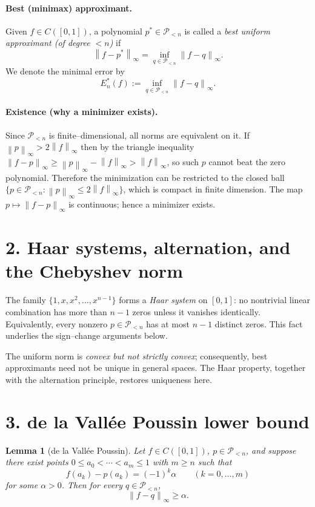 \documentclass[11pt,a4paper]{article}
\theoremstyle{definition}
\theoremstyle{definition}
\theoremstyle{plain}
\newtheorem{lemma}[exercise]{Lemma}
\theoremstyle{remark}
\newcommand{\norm}[1]{\left\lVert #1 \right\rVert}
\newcommand{\Pspace}{\mathcal{P}_{<n}}
\begin{document}
\paragraph{Best (minimax) approximant.}
Given \(f\in C([0,1])\), a polynomial \(p^\ast\in \Pspace\) is called a
\emph{best uniform approximant (of degree \(<n\))} if
\[
\norm{f-p^\ast}_\infty = \inf_{q\in \Pspace} \norm{f-q}_\infty .
\]
We denote the minimal error by
\[
E^\ast_n(f) := \inf_{q\in \Pspace} \norm{f-q}_\infty .
\]

\paragraph{Existence (why a minimizer exists).}
Since \(\Pspace\) is finite–dimensional, all norms are equivalent on it.
If \(\norm{p}_\infty > 2\norm{f}_\infty\) then by the triangle inequality
\(\norm{f-p}_\infty \ge \norm{p}_\infty - \norm{f}_\infty > \norm{f}_\infty\),
so such \(p\) cannot beat the zero polynomial.
Therefore the minimization can be restricted to the closed ball
\(\{p\in \Pspace : \norm{p}_\infty \le 2\norm{f}_\infty\}\), which is compact in finite dimension.
The map \(p \mapsto \norm{f-p}_\infty\) is continuous; hence a minimizer exists.

\section*{2. Haar systems, alternation, and the Chebyshev norm}
The family \(\{1,x,x^2,\dots,x^{n-1}\}\) forms a \emph{Haar system} on \([0,1]\): no nontrivial linear combination
has more than \(n-1\) zeros unless it vanishes identically. Equivalently, every nonzero \(p\in \Pspace\)
has at most \(n-1\) distinct zeros. This fact underlies the sign–change arguments below.

The uniform norm is \emph{convex but not strictly convex}; consequently, best approximants need not be unique
in general spaces. The Haar property, together with the alternation principle, restores uniqueness here.

\section*{3. de la Vallée Poussin lower bound}
\begin{lemma}[de la Vallée Poussin]\label{dlVP}
	Let \(f\in C([0,1])\), \(p\in \Pspace\), and suppose there exist points
	\(0\le a_0<\cdots<a_m\le 1\) with \(m\ge n\) such that
	\[
	f(a_k)-p(a_k) = (-1)^k \alpha \qquad (k=0,\dots,m)
	\]
	for some \(\alpha>0\). Then for every \(q\in \Pspace\),
	\[
	\norm{f-q}_\infty \ge \alpha .
	\]
\end{lemma}
\end{document}
